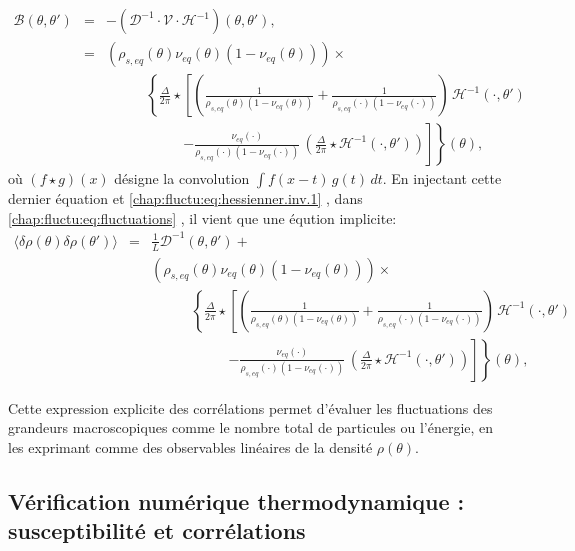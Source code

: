 \begin{eqnarray*}
	\mathcal{B}(\theta , \theta ' )  & = & - (\mathcal{D}^{-1}\cdot\mathcal{V}\cdot \mathcal{H}^{-1})(\theta , \theta') 	,\\
	& = & 	(\rho_{\! s , eq}(\theta) \nu_{\! eq}(\theta) (1 -  \nu_{\! eq}(\theta) )) \times \\
	&& ~~~~~~~~~~~~~\left \{  \frac{\Delta}{2\pi} \star  \left [ \left (  \frac{1}{\rho_{\! s, eq}(\theta)  (1 - \nu_{\! eq}(\theta)  )} +  \frac{1}{\rho_{\! s, eq}(\cdot) (1 - \nu_{\! eq} (\cdot )  )}\right )  \, \mathcal{H}^{-1}( \cdot , \theta ' )   \right. \right .\\
	&&  ~~~~~~~~~~~~~~~~~~~~~~~~~\left . \left .   -  \frac{\nu_{\! eq}(\cdot)}{\rho_{\! s, eq}(\cdot) ( 1 - \nu_{\! eq}(\cdot) )}  \, \left ( \frac{\Delta}{2\pi} \star \mathcal{H}^{-1}( \cdot , \theta ' )   \right )  \right ] \right \} (\theta),
\end{eqnarray*}
où \( (f \star g)(x) \) désigne la convolution \( \int f(x - t)\, g(t)\, dt \).
En injectant cette dernier équation et \eqref{chap:fluctu:eq:hessienner.inv.1} , dans \eqref{chap:fluctu:eq:fluctuations} , il vient que une éqution implicite:
\begin{eqnarray*}
	\langle \delta \rho(\theta) \delta	\rho(\theta') \rangle & = & \frac{1}{L} \mathcal{D}^{-1}(\theta , \theta') + \\
	&& 	(\rho_{\! s , eq}(\theta) \nu_{\! eq}(\theta) (1 -  \nu_{\! eq}(\theta) )) \times \\
	&& ~~~~~~~~~~~~~\left \{  \frac{\Delta}{2\pi} \star  \left [ \left (  \frac{1}{\rho_{\! s, eq}(\theta)  (1 - \nu_{\! eq}(\theta)  )} +  \frac{1}{\rho_{\! s, eq}(\cdot) (1 - \nu_{\! eq} (\cdot )  )}\right )  \, \mathcal{H}^{-1}( \cdot , \theta ' )   \right. \right .\\
	&&  ~~~~~~~~~~~~~~~~~~~~~~~~~\left . \left .   -  \frac{\nu_{\! eq}(\cdot)}{\rho_{\! s, eq}(\cdot) ( 1 - \nu_{\! eq}(\cdot) )}  \, \left ( \frac{\Delta}{2\pi} \star \mathcal{H}^{-1}( \cdot , \theta ' )   \right )  \right ] \right \} (\theta),
\end{eqnarray*}





Cette expression explicite des corrélations permet d'évaluer les fluctuations des grandeurs macroscopiques comme le nombre total de particules ou l'énergie, en les exprimant comme des observables linéaires de la densité \( \rho(\theta) \).


\subsection{Vérification numérique thermodynamique : susceptibilité et corrélations}

